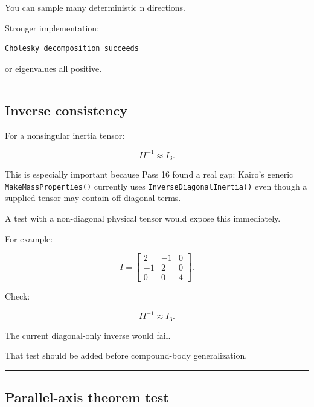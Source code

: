 You can sample many deterministic n directions.

Stronger implementation:

\begin{verbatim}
Cholesky decomposition succeeds
\end{verbatim}

or eigenvalues all positive.

\begin{center}\rule{0.5\linewidth}{0.5pt}\end{center}

\subsection{Inverse consistency}\label{06-engine-ii-ch039-inverse-consistency}

\hypertarget{06-engine-ii-ch039-inverse-consistency}{}

For a nonsingular inertia tensor:

\[
\boxed{
II^{-1}\approx I_3.
}
\]

This is especially important because Pass 16 found a real gap: Kairo's generic \texttt{MakeMassProperties()} currently uses \texttt{InverseDiagonalInertia()} even though a supplied tensor may contain off-diagonal terms.

A test with a non-diagonal physical tensor would expose this immediately.

For example:

\[
I=
\begin{bmatrix}
2&-1&0\\
-1&2&0\\
0&0&4
\end{bmatrix}.
\]

Check:

\[
II^{-1}\approx I_3.
\]

The current diagonal-only inverse would fail.

That test should be added before compound-body generalization.

\begin{center}\rule{0.5\linewidth}{0.5pt}\end{center}

\subsection{Parallel-axis theorem test}\label{06-engine-ii-ch039-parallel-axis-theorem-test}

\hypertarget{06-engine-ii-ch039-parallel-axis-theorem-test}{}

